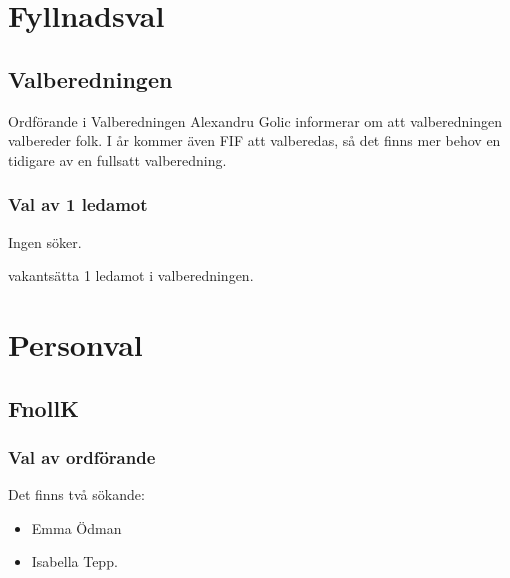 \documentclass[hidelinks]{sektionsmote} %
\begin{document}
\section{Fyllnadsval}
\subsection{Valberedningen}
Ordförande i Valberedningen Alexandru Golic informerar om att valberedningen valbereder folk.
I år kommer även FIF att valberedas, så det finns mer behov en tidigare av en fullsatt valberedning.

\subsubsection{Val av 1 ledamot}
Ingen söker.
\begin{beslut}
  \item vakantsätta 1 ledamot i valberedningen.
\end{beslut}


\section{Personval}
\subsection{FnollK}
\subsubsection{Val av ordförande}
Det finns två sökande:
\begin{itemize}
    \item Emma Ödman
    \item Isabella Tepp.
\end{itemize}
\end{document}
